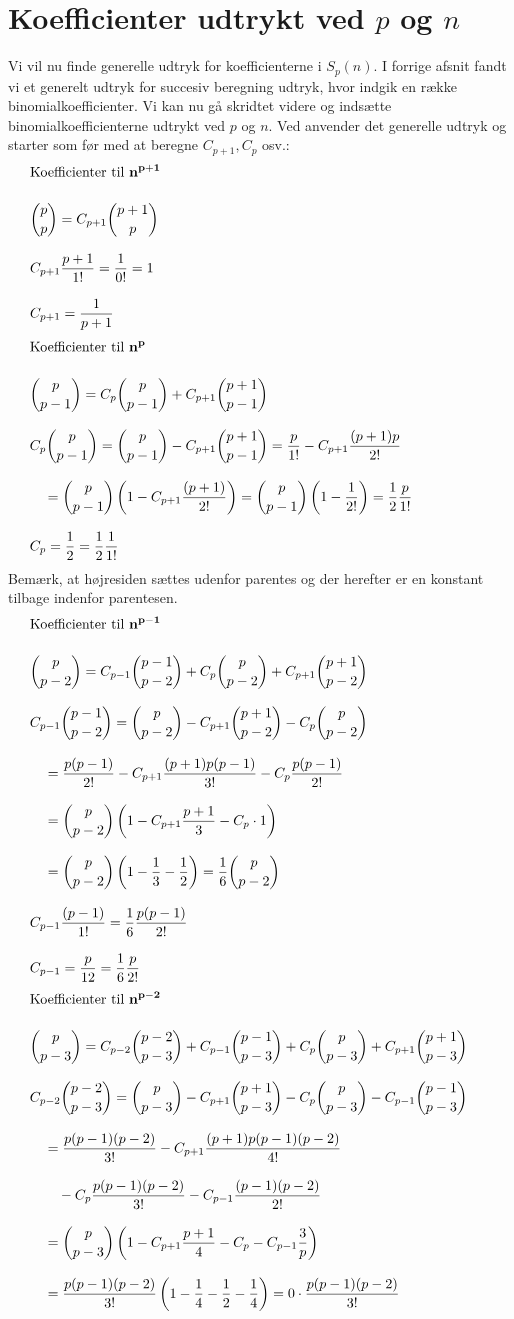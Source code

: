 \section{Koefficienter udtrykt ved \(p\) og \(n\)}
Vi vil nu finde generelle udtryk for koefficienterne i \(S_p(n)\). I forrige afsnit fandt vi et generelt udtryk for succesiv beregning udtryk, hvor indgik en række binomialkoefficienter. Vi kan nu gå skridtet videre og indsætte binomialkoefficienterne udtrykt ved \(p\) og \(n\). Ved anvender det generelle udtryk og starter som før med at beregne \(C_{p+1}, C_p\) osv.:\\
%
%
\begin{align*}
&\text{Koefficienter til \(\mathbf{n^{p+1}}\)}\nylinie
&\MinLinie
&\binom{p}{p}=C_{p+1}\binom{p+1}{p}\nylinie
&C_{p+1}\frac{p+1}{1!}=\frac{1}{0!}=1\nylinie
&C_{p+1}=\frac{1}{p+1}
\end{align*}
\begin{align*}
&\text{Koefficienter til \(\mathbf{n^{p}}\)}\nylinie
&\MinLinie
&\binom{p}{p-1}=C_{p}\binom{p}{p-1}+C_{p+1}\binom{p+1}{p-1}\nylinie
&C_{p}\binom{p}{p-1}=\binom{p}{p-1}-C_{p+1}\binom{p+1}{p-1}=\frac{p}{1!}-C_{p+1}\frac{(p+1)p}{2!}\nylinie
& \quad =\binom{p}{p-1}\left(1-C_{p+1}\frac{(p+1)}{2!}\right)=\binom{p}{p-1}\left(1-\frac{1}{2!}\right)=\frac{1}{2}\frac{p}{1!}\nylinie
&C_{p}=\frac{1}{2}=\frac{1}{2}\frac{1}{1!}\\
\end{align*}
Bemærk, at højresiden sættes udenfor parentes og der herefter er en konstant tilbage indenfor parentesen.
\begin{align*}
&\text{Koefficienter til \(\mathbf{n^{p-1}}\)}\nylinie
&\MinLinie
&\binom{p}{p-2}=C_{p-1}\binom{p-1}{p-2}+C_{p}\binom{p}{p-2}+C_{p+1}\binom{p+1}{p-2}\nylinie
&C_{p-1}\binom{p-1}{p-2}=\binom{p}{p-2}-C_{p+1}\binom{p+1}{p-2}-C_{p}\binom{p}{p-2}\nylinie
&\quad =\frac{p(p-1)}{2!}-C_{p+1}\frac{(p+1)p(p-1)}{3!}-C_{p}\frac{p(p-1)}{2!}\nylinie
&\quad =\binom{p}{p-2}\left(1-C_{p+1}\frac{p+1}{3}-C_{p} \cdot 1\right)\nylinie
&\quad =\binom{p}{p-2}\left(1-\frac{1}{3}-\frac{1}{2}\right)=\frac{1}{6}\binom{p}{p-2}\nylinie
&C_{p-1}\frac{(p-1)}{1!}=\frac{1}{6}\frac{p(p-1)}{2!}\nylinie
&C_{p-1}=\frac{p}{12}=\frac{1}{6}\frac{p}{2!}
\end{align*}
\begin{align*}
&\text{Koefficienter til \(\mathbf{n^{p-2}}\)}\nylinie
&\MinLinie
&\binom{p}{p-3}=C_{p-2}\binom{p-2}{p-3}+C_{p-1}\binom{p-1}{p-3}+C_{p}\binom{p}{p-3}+C_{p+1}\binom{p+1}{p-3}\nylinie
&C_{p-2}\binom{p-2}{p-3}=\binom{p}{p-3}-C_{p+1}\binom{p+1}{p-3}-C_{p}\binom{p}{p-3}-C_{p-1}\binom{p-1}{p-3}\nylinie
&\quad=\frac{p(p-1)(p-2)}{3!}-C_{p+1}\frac{(p+1)p(p-1)(p-2)}{4!}\nylinie
&\qquad -C_{p}\frac{p(p-1)(p-2)}{3!}-C_{p-1}\frac{(p-1)(p-2)}{2!}\nylinie
&\quad=\binom{p}{p-3}\left(1-C_{p+1}\frac{p+1}{4}-C_{p}-C_{p-1}\frac{3}{p}\right)\nylinie
&\quad=\frac{p(p-1)(p-2)}{3!}\left(1-\frac{1}{4}-\frac{1}{2}-\frac{1}{4}\right)=0\cdot \frac{p(p-1)(p-2)}{3!}\nylinie
\end{align*}
